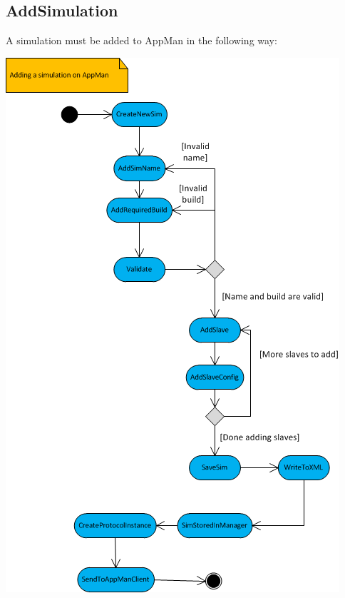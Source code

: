 \documentclass[a4paper,12pt,final]{article}
\begin{document}
\subsection{AddSimulation}
A simulation must be added to AppMan in the following way:
\begin{center}
\includegraphics[scale=0.9]{AddSimulationActivity.png}
\end{center}

\newpage
\end{document}
